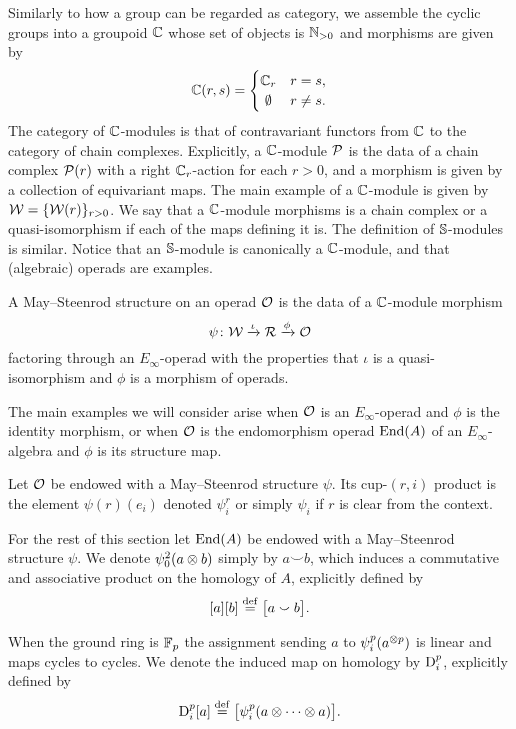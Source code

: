 \sssec

Similarly to how a group can be regarded as category, we assemble the cyclic groups into a groupoid $\mathbb{C}$ whose set of objects is $\mathbb{N}_{>0}$ and morphisms are given by
\[
\cyc(r,s) =
\begin{cases}
	\cyc_r & r = s, \\
	\hfil \emptyset & r \neq s.
\end{cases}
\]
The category of $\mathbb{C}$-modules is that of contravariant functors from $\mathbb{C}$ to the category of chain complexes.
Explicitly, a $\mathbb{C}$-module $\mathcal{P}$ is the data of a chain complex $\mathcal{P}(r)$ with a right $\mathbb{C}_r$-action for each $r > 0$, and a morphism is given by a collection of equivariant maps.
The main example of a $\mathbb{C}$-module is given by $\mathcal{W} = \{\mathcal{W}(r)\}_{r>0}$.
We say that a $\mathbb{C}$-module morphisms is a chain complex or a quasi-isomorphism if each of the maps defining it is.
The definition of $\mathbb{S}$-modules is similar.
Notice that an $\mathbb{S}$-module is canonically a $\mathbb{C}$-module, and that (algebraic) operads are examples.

\sssec

A May--Steenrod structure on an operad $\mathcal{O}$ is the data of a $\mathbb{C}$-module morphism
\[
\psi \colon \mathcal{W} \xrightarrow{\iota} \mathcal{R} \xrightarrow{\phi} \mathcal{O}
\]
factoring through an $E_\infty$-operad with the properties that $\iota$ is a quasi-isomorphism and $\phi$ is a morphism of operads.

The main examples we will consider arise when $\mathcal{O}$ is an $E_\infty$-operad and $\phi$ is the identity morphism, or when $\mathcal{O}$ is the endomorphism operad $\mathrm{End}(A)$ of an $E_\infty$-algebra and $\phi$ is its structure map.

\sssec

Let $\mathcal{O}$ be endowed with a May--Steenrod structure $\psi$.
Its cup-$(r,i)$ product
is the element $\psi(r)(e_i)$ denoted $\psi_i^r$ or simply $\psi_i$ if $r$ is clear from the context.

\sssec

For the rest of this section let $\mathrm{End}(A)$ be endowed with a May--Steenrod structure $\psi$.
We denote $\psi_0^2(a \otimes b)$ simply by $a \smallsmile b$, which induces a commutative and associative product on the homology of $A$, explicitly defined by
\[
[a][b] \stackrel{\mathrm{def}}{=} \big[a \smallsmile b\big].
\]

\sssec

When the ground ring is ${\mathbb{F}_p}$ the assignment sending $a$ to $\psi_i^p(a^{\otimes p})$ is linear and maps cycles to cycles.
We denote the induced map on homology by $\mathrm{D}_i^p$, explicitly defined by
\[
\mathrm{D}_i^p[a] \stackrel{\mathrm{def}}{=} \big[\psi_i^p(a \otimes\dotsb\otimes a)\big].
\]

